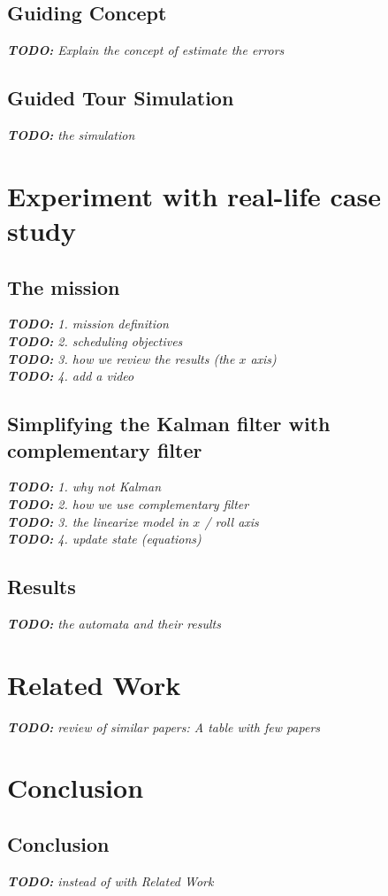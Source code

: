 \documentclass{beamer}
\newcommand\todoil[1]{ {\centering \color{red}\textit{\textbf{TODO:} #1}}\\ }
\begin{document}
\subsection{Guiding Concept}
    \todoil{Explain the concept of estimate the errors}
\subsection{Guided Tour Simulation}
    \todoil{the simulation}
    

\section{Experiment with real-life case study}
\subsection{The mission}
    \todoil{1. mission definition}
    \todoil{2. scheduling objectives}
    \todoil{3. how we review the results (the $x$ axis)}
    \todoil{4. add a video}
\subsection{Simplifying the Kalman filter with complementary filter}
    \todoil{1. why not Kalman}
    \todoil{2. how we use complementary filter}
    \todoil{3. the linearize model in $x$ / roll axis}
    \todoil{4. update state (equations)}
\subsection{Results}
    \todoil{the automata and their results}

\section{Related Work}
    \todoil{review of similar papers: A table with few papers}

\section{Conclusion}
\subsection{Conclusion}
    \todoil{instead of with Related Work}
\end{document}
